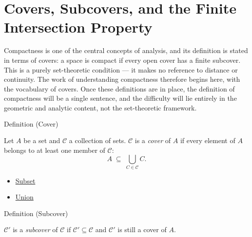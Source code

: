 
\section{Covers, Subcovers, and the Finite Intersection Property}


\begin{exposition}
Compactness is one of the central concepts of analysis, and its definition is
stated in terms of covers: a space is compact if every open cover has a finite
subcover. This is a purely set-theoretic condition --- it makes no reference to
distance or continuity. The work of understanding compactness therefore begins
here, with the vocabulary of covers. Once these definitions are in place, the
definition of compactness will be a single sentence, and the difficulty will
lie entirely in the geometric and analytic content, not the set-theoretic
framework.
\end{exposition}


\begin{definitionbox}{Definition (Cover)}
\begin{definition}[Cover]\label{def:cover-full}
Let $A$ be a set and $\mathcal{C}$ a collection of sets.
$\mathcal{C}$ is a \emph{cover} of $A$ if every element of $A$ belongs to
at least one member of $\mathcal{C}$:
\[
A \;\subseteq\; \bigcup_{C \in \mathcal{C}} C.
\]
\end{definition}
\end{definitionbox}

\begin{dependencies}
\begin{itemize}
  \item \hyperref[def:subset]{Subset}
  \item \hyperref[def:union]{Union}
\end{itemize}
\end{dependencies}

\begin{definitionbox}{Definition (Subcover)}
\begin{definition}[Subcover]\label{def:subcover}
$\mathcal{C}'$ is a \emph{subcover} of $\mathcal{C}$ if $\mathcal{C}'
\subseteq \mathcal{C}$ and $\mathcal{C}'$ is still a cover of $A$.
\end{definition}
\end{definitionbox}


